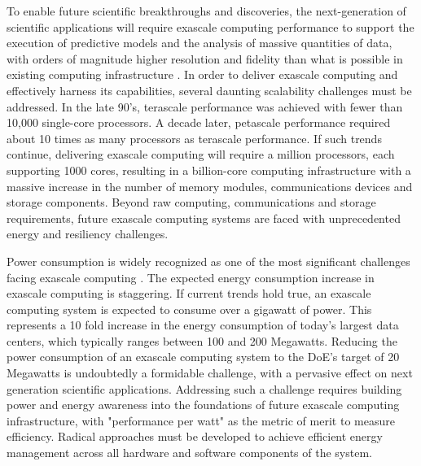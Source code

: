 
To enable future scientific breakthroughs and discoveries, the
next-generation of scientific applications will require exascale
computing performance to support the execution of predictive models
and the analysis of massive quantities of data, with orders of
magnitude higher resolution and fidelity than what is possible in
existing computing infrastructure \cite{sachs_ascr_2011,
doe_exascale_2010}. In order to deliver exascale computing and
effectively harness its capabilities, several daunting scalability
challenges must be addressed. In the late 90's, terascale performance
was achieved with fewer than 10,000 single-core processors. A decade
later, petascale performance required about 10 times as many
processors as terascale performance. If such trends continue,
delivering exascale computing will require a million processors, each
supporting 1000 cores, resulting in a billion-core computing
infrastructure with a massive increase in the number of memory
modules, communications devices and storage components. Beyond raw
computing, communications and storage requirements, future exascale
computing systems are faced with unprecedented energy and resiliency
challenges.

Power consumption is widely recognized as one of the most significant
challenges facing exascale computing
\cite{doe_exascale_2010,sachs_ascr_2011}. The expected energy
consumption increase in exascale computing is staggering. If current
trends hold true, an exascale computing system is expected to consume
over a gigawatt of power. This represents a 10 fold increase in the
energy consumption of today's largest data centers, which typically
ranges between 100 and 200 Megawatts. Reducing the power consumption
of an exascale computing system to the DoE's target of 20 Megawatts is
undoubtedly a formidable challenge, with a pervasive effect on next
generation scientific applications. Addressing such a challenge
requires building power and energy awareness into the foundations of
future exascale computing infrastructure, with "performance per watt"
as the metric of merit to measure efficiency. Radical approaches must
be developed to achieve efficient energy management across all
hardware and software components of the system.

